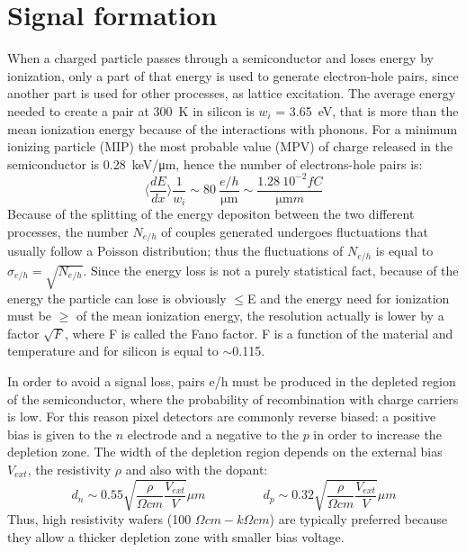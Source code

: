 \section{Signal formation}
   When a charged particle passes through a semiconductor and loses energy by ionization, only a part of that energy is used to generate electron-hole pairs, since another part is used for other processes, as lattice excitation.
   The average energy needed to create a pair at \SI{300}{K} in silicon is $w_i$ = \SI{3.65}{eV}, that is more than the mean ionization energy because of the interactions with phonons. For a minimum ionizing particle (MIP) the most probable value (MPV) of charge released in the semiconductor is \SI{0.28}{keV/\um}, hence the number of electrons-hole pairs is: 
   \begin{equation}
       \langle \frac{dE}{dx}\rangle \frac{1}{w_i} \sim 80 \: \frac{e/h}{\si{\um}} \sim \frac{1.28 \:10^{-2}fC}{\si{\um} m}
   \end{equation}
   Because of the splitting of the energy depositon between the two different processes, the number $N_{e/h}$ of couples generated undergoes fluctuations that usually follow a Poisson distribution;
   thus the fluctuations of $N_{e/h}$ is equal to  $\sigma_{e/h} =\sqrt{N_{e/h}}$. Since the energy loss is not a purely statistical fact, because of the energy the particle can lose is obviously $\leqslant$E and the energy need for ionization must be $\geqslant$ of the mean ionization energy, the resolution actually is lower by a factor $\sqrt{F}$, where F is called the Fano factor. F is a function of the material and temperature and for silicon is equal to $\sim$0.115.

   In order to avoid a signal loss, pairs e/h must be produced in the depleted region of the semiconductor, where the probability of recombination with charge carriers is low.
   For this reason pixel detectors are commonly reverse biased: a positive bias is given to the $n$ electrode and a negative to the $p$ in order to increase the depletion zone. 
   The width of the depletion region depends on the external bias $V_{ext}$, the resistivity $\rho$ and also with the dopant:
   \begin{equation}
      d_{n} \sim 0.55 \sqrt{\frac{\rho}{\Omega cm}\frac{V_{ext}}{V}} \mu m 
      \hspace{55pt}
      d_{p} \sim 0.32 \sqrt{\frac{\rho}{\Omega cm}\frac{V_{ext}}{V}} \mu m
      \label{eq:deplation_d}
   \end{equation}
   Thus, high resistivity wafers (100 $\Omega cm - k\Omega cm$) are typically preferred because they allow a thicker depletion zone with smaller bias voltage. 

